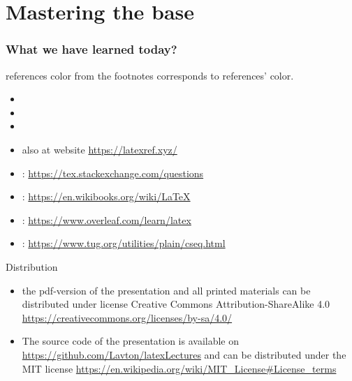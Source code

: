 \documentclass[14pt, aspectratio=169]{beamer}
\begin{document}


\section{Mastering the base}



\begin{frame}\frametitle{What we have learned today?}
\tableofcontents
\end{frame}

\begin{frame}[allowframebreaks]{references}
color from the footnotes corresponds to references' color.
    \begin{itemize}
        \item {}
        \item {}
        \item {}
        \item {} also at website \url{https://latexref.xyz/}
        \item {} : \url{https://tex.stackexchange.com/questions}
        \item {} : \url{https://en.wikibooks.org/wiki/LaTeX}
        \item {} : \url{https://www.overleaf.com/learn/latex}
        \item {} : \url{https://www.tug.org/utilities/plain/cseq.html}
    \end{itemize}
\end{frame}

\begin{frame}{Distribution}\relax
\begin{itemize}
     \item the pdf-version of the presentation and all printed materials can be distributed under license Creative Commons Attribution-ShareAlike 4.0 \url{https://creativecommons.org/licenses/by-sa/4.0/}
     \item The source code of the presentation is available on {\csk\url{https://github.com/Lavton/latexLectures}} and can be distributed under the MIT license \url{https://en.wikipedia.org/wiki/MIT_License\#License_terms}
\end{itemize}
     
\end{frame}
\end{document}
